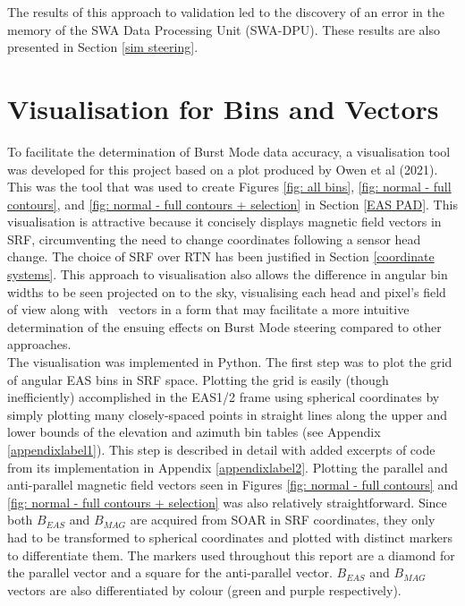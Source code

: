 The results of this approach to validation led to the discovery of an error in the memory of the SWA Data Processing Unit (SWA-DPU). These results are also presented in Section \ref{sim steering}.

\section{Visualisation for Bins and Vectors} \label{visualisation}
To facilitate the determination of Burst Mode data accuracy, a visualisation tool was developed for this project based on a plot produced by Owen et al (2021)\cite{owen2021}. This was the tool that was used to create Figures \ref{fig: all bins}, \ref{fig: normal - full contours}, and \ref{fig: normal - full contours + selection} in Section \ref{EAS PAD}. This visualisation is attractive because it concisely displays magnetic field vectors in SRF, circumventing the need to change coordinates following a sensor head change. The choice of SRF over RTN has been justified in Section \ref{coordinate systems}. This approach to visualisation also allows the difference in angular bin widths to be seen projected on to the sky, visualising each head and pixel's field of view along with \Beas\ vectors in a form that may facilitate a more intuitive determination of the ensuing effects on Burst Mode steering compared to other approaches.
\\

The visualisation was implemented in Python. The first step was to plot the grid of angular EAS bins in SRF space. Plotting the grid is easily (though inefficiently) accomplished in the EAS1/2 frame using spherical coordinates by simply plotting many closely-spaced points in straight lines along the upper and lower bounds of the elevation and azimuth bin tables (see Appendix \ref{appendixlabel1}). This step is described in detail with added excerpts of code from its implementation in Appendix \ref{appendixlabel2}. Plotting the parallel and anti-parallel magnetic field vectors seen in Figures \ref{fig: normal - full contours} and \ref{fig: normal - full contours + selection} was also relatively straightforward. Since both \(B_{EAS}\) and \(B_{MAG}\) are acquired from SOAR in SRF coordinates, they only had to be transformed to spherical coordinates and plotted with distinct markers to differentiate them. The markers used throughout this report are a diamond for the parallel vector and a square for the anti-parallel vector. \(B_{EAS}\) and \(B_{MAG}\) vectors are also differentiated by colour (green and purple respectively).
\\

